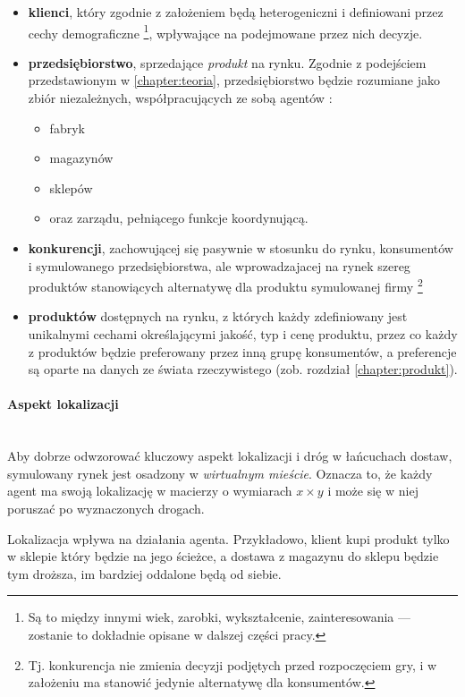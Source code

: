 \documentclass[polish, twoside, 12pt, a4paper]{article}
\theoremstyle{definition}
\theoremstyle{plain}
\theoremstyle{remark}
\begin{document}
\begin{itemize} 
	\item \textbf{klienci}, który zgodnie z założeniem będą heterogeniczni i definiowani przez cechy demograficzne \footnote{Są to między innymi wiek, zarobki, wykształcenie, zainteresowania --- zostanie to dokładnie opisane w dalszej części pracy.}, wpływające na podejmowane przez nich decyzje.
	\item \textbf{przedsiębiorstwo}, sprzedające \textit{produkt} na rynku. Zgodnie z podejściem przedstawionym w \ref{chapter:teoria}, przedsiębiorstwo będzie rozumiane jako zbiór niezależnych, współpracujących ze sobą agentów :
		\begin{itemize}
			\item fabryk
			\item magazynów
			\item sklepów 
			\item oraz zarządu, pełniącego funkcje koordynującą.
		\end{itemize}
	\item \textbf{konkurencji}, zachowującej się pasywnie w stosunku do rynku, konsumentów i symulowanego przedsiębiorstwa, ale wprowadzajacej na rynek szereg produktów stanowiących alternatywę dla produktu symulowanej firmy \footnote{Tj. konkurencja nie zmienia decyzji podjętych przed rozpoczęciem gry, i w założeniu ma stanowić jedynie alternatywę dla konsumentów.} 
	\item \textbf{produktów} dostępnych na rynku, z których każdy zdefiniowany jest unikalnymi cechami określającymi jakość, typ i cenę produktu, przez co każdy z produktów będzie preferowany przez inną grupę konsumentów, a preferencje są oparte na danych ze świata rzeczywistego (zob. rozdział \ref{chapter:produkt}). 
\end{itemize}

\paragraph{Aspekt lokalizacji}\mbox{}\\

Aby dobrze odwzorować kluczowy aspekt lokalizacji i dróg w łańcuchach dostaw, symulowany rynek jest osadzony w \textit{wirtualnym mieście}. Oznacza to, że każdy agent ma swoją lokalizację w macierzy o wymiarach $x \times y$ i może się w niej poruszać po wyznaczonych drogach.

Lokalizacja wpływa na działania agenta. Przykładowo, klient kupi produkt tylko w sklepie który będzie na jego ścieżce, a dostawa z magazynu do sklepu będzie tym droższa, im bardziej oddalone będą od siebie. 
\end{document}
